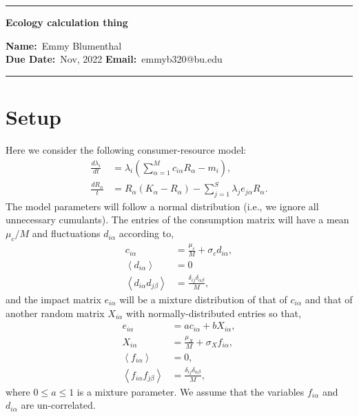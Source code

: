 \documentclass[10pt]{article}
\newcommand{\1}{\mathbf 1}
\newcommand{\ip}[1]{\left< #1 \right>}
\begin{document}
\begin{center}
	\hrule
	\vspace{.4cm}
	{\textbf { \large Ecology calculation thing}}
\end{center}
{\textbf{Name:}\ Emmy Blumenthal \hspace{\fill} \hspace{\fill} \  \\
\textbf{Due Date:}\  Nov, 2022   \hspace{\fill} \textbf{Email:}\ emmyb320@bu.edu \ 
\vspace{.4cm}
\hrule

\section{Setup}

Here we consider the following consumer-resource model:
\begin{align}
	\frac{d\lambda_i}{dt}
	&=
	\lambda_i 
	\left(
		\sum_{\alpha = 1}^M 
		c_{i\alpha} R_\alpha - m_i
	\right),
	\\
	\frac{dR_\alpha}{t}
	&=
	R_\alpha \left(
		K_\alpha - R_\alpha
	\right)
	-\sum_{j=1}^S \lambda_j e_{j\alpha} R_\alpha.
\end{align}
The model parameters will follow a normal distribution (i.e., we ignore all unnecessary cumulants).
The entries of the consumption matrix will have a mean $\mu_c/M$ and fluctuations $d_{i\alpha}$ according to,
\begin{align}
	c_{i\alpha}
	&=
	\frac{\mu_c}{M} + \sigma_c d_{i\alpha},
	\\
	\ip{d_{i\alpha}} &= 0
	\\
	\ip{d_{i\alpha} d_{j\beta}}
	&=
	\frac{\delta_{ij} \delta_{\alpha \beta}}{M},
	\label{dVarCond}
\end{align}
and the impact matrix $e_{i\alpha}$ will be a mixture distribution of that of $c_{i\alpha}$ and that of another random matrix $X_{i\alpha}$ with normally-distributed entries so that,
\begin{align}
	e_{i\alpha}
	&=
	a c_{i\alpha}
	+
	b X_{i\alpha},
	\\
	X_{i\alpha}
	&=
	\frac{\mu_X}{M}
	+
	\sigma_X f_{i\alpha},
	\\
	\ip{f_{i\alpha}}
	&=
	0,\\
	\ip{f_{i\alpha} f_{j\beta}}
	&=
	\frac{\delta_{ij} \delta_{\alpha \beta}}{M},
	\label{fVarCond}
\end{align}
where $0 \leq a \leq 1$ is a mixture parameter.
We assume that the variables $f_{i\alpha}$ and $d_{i\alpha}$ are un-correlated.
}
\end{document}
